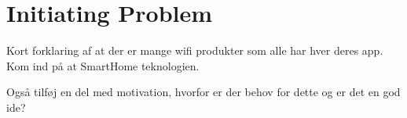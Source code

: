 \section{Initiating Problem} \label{sec:initiating-problem}

Kort forklaring af at der er mange wifi produkter som alle har hver deres app. Kom ind på at SmartHome teknologien.

Også tilføj en del med motivation, hvorfor er der behov for dette og er det en god ide?